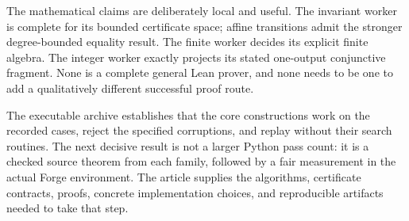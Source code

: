 The mathematical claims are deliberately local and useful. The invariant worker
is complete for its bounded certificate space; affine transitions admit the
stronger degree-bounded equality result. The finite worker decides its explicit
finite algebra. The integer worker exactly projects its stated one-output
conjunctive fragment. None is a complete general Lean prover, and none needs to
be one to add a qualitatively different successful proof route.

The executable archive establishes that the core constructions work on the
recorded cases, reject the specified corruptions, and replay without their
search routines. The next decisive result is not a larger Python pass count: it
is a checked source theorem from each family, followed by a fair measurement in
the actual Forge environment. The article supplies the algorithms, certificate
contracts, proofs, concrete implementation choices, and reproducible artifacts
needed to take that step.
